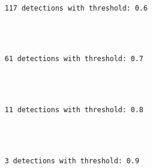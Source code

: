 \documentclass[11pt]{article}
\begin{document}
    \begin{center}
    \end{center}
    { \hspace*{\fill} \\}
    
    \begin{Verbatim}[commandchars=\\\{\}]
117 detections with threshold: 0.6


    \end{Verbatim}

    \begin{center}
    \end{center}
    { \hspace*{\fill} \\}
    
    \begin{Verbatim}[commandchars=\\\{\}]
61 detections with threshold: 0.7


    \end{Verbatim}

    \begin{center}
    \end{center}
    { \hspace*{\fill} \\}
    
    \begin{Verbatim}[commandchars=\\\{\}]
11 detections with threshold: 0.8


    \end{Verbatim}

    \begin{center}
    \end{center}
    { \hspace*{\fill} \\}
    
    \begin{Verbatim}[commandchars=\\\{\}]
3 detections with threshold: 0.9


    \end{Verbatim}
\end{document}
